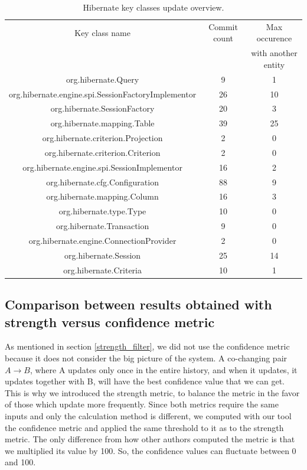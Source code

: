 \documentclass[runningheads]{comsis2}
\begin{document}
\begin{table}[!h]
\setlength\tabcolsep{3.5pt}
\caption{ Hibernate key classes update overview.}
\label{tab:overviewcommit:hibernate}
\centering
\begin{tabular}{|c|c|c|}
\hline
Key class name &	Commit count	&	Max occurence 	 \\
&		&	with another entity	 \\
\hline

org.hibernate.Query	&	9	&	1	\\
org.hibernate.engine.spi.SessionFactoryImplementor	&	26	&	10	\\
org.hibernate.SessionFactory	&	20	&	3	\\
org.hibernate.mapping.Table	&	39	&	25	\\
org.hibernate.criterion.Projection	&	2	&	0	\\
org.hibernate.criterion.Criterion	&	2	&	0	\\
org.hibernate.engine.spi.SessionImplementor	&	16	&	2	\\
org.hibernate.cfg.Configuration	&	88	&	9	\\
org.hibernate.mapping.Column	&	16	&	3	\\
org.hibernate.type.Type	&	10	&	0	\\
org.hibernate.Transaction	&	9	&	0	\\
org.hibernate.engine.ConnectionProvider	&	2	&	0	\\
org.hibernate.Session	&	25	&	14	\\
org.hibernate.Criteria	&	10	&	1	\\


\hline
\end{tabular}
\end{table}



\subsection{Comparison between results obtained with strength versus confidence metric}
\label{sec:measure_metrics}


As mentioned in section \ref{strength_filter}, we did not use the confidence metric because it does not consider the big picture of the system.
A co-changing pair $A \rightarrow B$, where A updates only once in the entire history, and when it updates, it updates together with B, will have the best confidence value that we can get. This is why we introduced the strength metric, to balance the metric in the favor of those which update more frequently.
Since both metrics require the same inputs and only the calculation method is different, we computed with our tool the confidence metric and applied the same threshold to it as to the strength metric. The only difference from how other authors computed the metric is that we multiplied its value by 100. So, the confidence values can fluctuate between 0 and 100.
\end{document}
